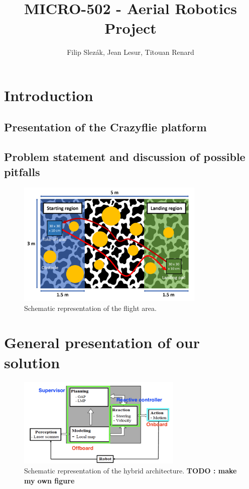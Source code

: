 \documentclass[11pt]{article}
\title{MICRO-502 - Aerial Robotics Project}
\author{Filip Slezák, Jean Lesur, Titouan Renard}
\begin{document}
\maketitle

\section{Introduction}



\subsection{Presentation of the Crazyflie platform}

\subsection{Problem statement and discussion of possible pitfalls}

\begin{figure}[h!]
    \centering
    \includegraphics[width=0.8\textwidth]{figures/crazyfly_objective_figure.png}
    \caption{Schematic representation of the flight area.}
\end{figure}

\section{General presentation of our solution}

\begin{figure}[h!]
    \centering
    \includegraphics[width=0.7\textwidth]{figures/arch_provisoire.png}
    \caption{Schematic representation of the hybrid architecture. \textbf{TODO : make my own figure}}
\end{figure}
\end{document}
